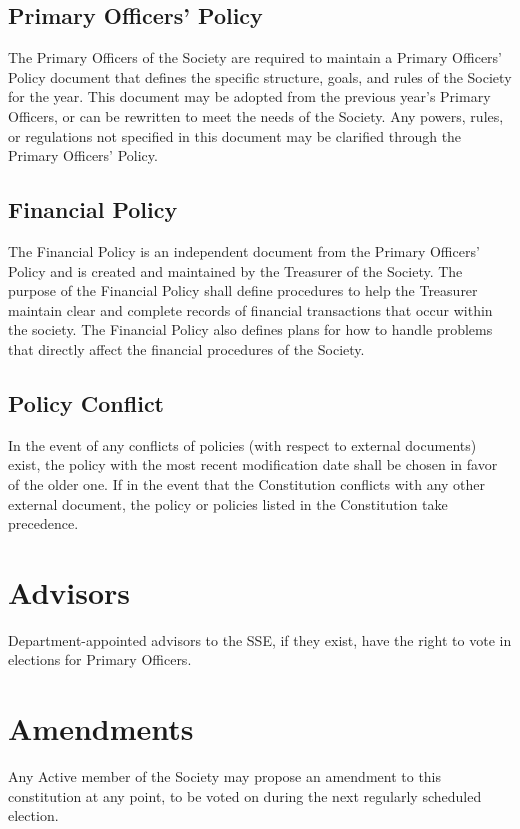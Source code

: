 \documentclass[american]{article}
\begin{document}
\subsection{Primary Officers' Policy}
The Primary Officers of the Society are required to maintain a Primary Officers' Policy document that defines the specific structure, goals, and rules of the Society for the year. This document may be adopted from the previous year's Primary Officers, or can be rewritten to meet the needs of the Society. Any powers, rules, or regulations not specified in this document may be clarified through the Primary Officers' Policy.

\subsection{Financial Policy}
The Financial Policy is an independent document from the Primary Officers' Policy and is created and maintained by the Treasurer of the Society. The purpose of the Financial Policy shall define procedures to help the Treasurer maintain clear and complete records of financial transactions that occur within the society. The Financial Policy also defines plans for how to handle problems that directly affect the financial procedures of the Society.

\subsection{Policy Conflict}
In the event of any conflicts of policies (with respect to external documents) exist, the policy with the most recent modification date shall be chosen in favor of the older one. If in the event that the Constitution conflicts with any other external document, the policy or policies listed in the Constitution take precedence.

\section{Advisors}
Department-appointed advisors to the SSE, if they exist, have the right to vote in elections for Primary Officers.

\section{Amendments}
Any Active member of the Society may propose an amendment to this constitution at any point, to be voted on during the next regularly scheduled election.
\end{document}
